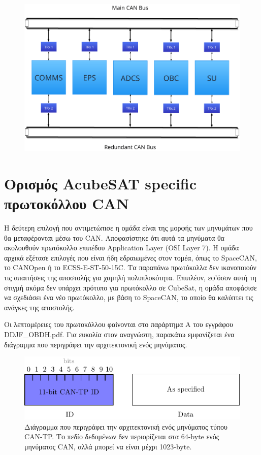 \documentclass[a4paper,nobib,justified]{tufte-book}
\begin{document}
\begin{figure}[h]
	\includegraphics[width=0.8\linewidth]{media/diagrams/subsystems-on-buses.pdf}
	\label{fig:dual-buses}
\end{figure}

\section{Ορισμός AcubeSAT specific πρωτοκόλλου CAN}
Η δεύτερη επιλογή που αντιμετώπισε η ομάδα είναι της μορφής των μηνυμάτων που θα μεταφέρονται μέσω του CAN. Αποφασίστηκε ότι αυτά τα μηνύματα θα ακολουθούν πρωτόκολλο επιπέδου Application Layer (OSI Layer 7). Η ομάδα αρχικά εξέτασε επιλογές που είναι ήδη εδραιωμένες στον τομέα, όπως το SpaceCAN, το CANOpen ή το ECSS-E-ST-50-15C. Τα παραπάνω πρωτόκολλα δεν ικανοποιούν τις απαιτήσεις της αποστολής για χαμηλή πολυπλοκότητα. Επιπλέον, εφ'όσον αυτή τη στιγμή ακόμα δεν υπάρχει πρότυπο για πρωτόκολλο σε CubeSat, η ομάδα αποφάσισε να σχεδιάσει ένα νέο πρωτόκολλο, με βάση το SpaceCAN, το οποίο θα καλύπτει τις ανάγκες της αποστολής.

Οι λεπτομέρειες του πρωτοκόλλου φαίνονται στο παράρτημα Α του εγγράφου DDJF\_OBDH.pdf. Για ευκολία στον αναγνώστη, παρακάτω εμφανίζεται ένα διάγραμμα που περιγράφει την αρχιτεκτονική ενός μηνύματος.

\begin{figure}
	\includegraphics[width=0.8\linewidth]{media/diagrams/tp-message-structure.pdf}
	\caption{Διάγραμμα που περιγράφει την αρχιτεκτονική ενός μηνύματος τύπου CAN-TP. Το πεδίο δεδομένων δεν περιορίζεται στα 64-byte ενός μηνύματος CAN, αλλά μπορεί να είναι μέχρι 1023-byte.}
	\label{fig:tp-message-structure}
\end{figure}
\end{document}
